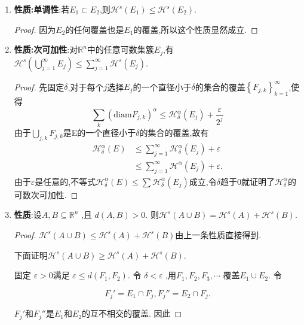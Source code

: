 \documentclass[hyperref,a4paper,UTF8]{ctexart}
\begin{document}
\begin{enumerate}

  \item \textbf{性质:单调性}:若$E_1 \subset E_2$,则$\mathcal{H}^s(E_1) \leqslant \mathcal{H}^s(E_2)$.

  \begin{proof}
    因为$E_2$的任何覆盖也是$E_1$的覆盖,所以这个性质显然成立.
  \end{proof}

  \item \textbf{性质:次可加性}:对$\mathbb{R}^n$中的任意可数集簇${E_j}$,有$\mathcal{H}^s\left(\bigcup\limits_{j=1}^{\infty} E_j\right) \leqslant \sum_{j=1}^{\infty} \mathcal{H}^s\left(E_j\right)$.
  \begin{proof}
    先固定$\delta$,对于每个$j$选择$E_j$的一个直径小于$\delta$的集合的覆盖$\left \{  F_{j,k} \right \}^{\infty}_{k=1}$,使得
    $$\sum_k(\mathrm{diam}F_{j,k})^{\alpha}\leqslant \mathcal{H}_\delta^\alpha(E_j)+\frac{\varepsilon}{2^j} $$
    由于$\bigcup\limits_{j,k} F_{j,k}$是E的一个直径小于$\delta$的集合的覆盖,故有
    \begin{align*}
      \mathcal{H}_\delta^\alpha(E) & \leqslant \sum_{j=1}^{\infty} \mathcal{H}_\delta^\alpha(E_j)+\varepsilon \\
      & \leqslant \sum_{j=1}^{\infty} \mathcal{H}^\alpha(E_j)+\varepsilon. 
    \end{align*}
    由于$\varepsilon$是任意的,不等式$\mathcal{H}_\delta^\alpha(E) \leqslant \sum \mathcal{H}_\delta^\alpha(E_j)$成立,令$\delta$趋于0就证明了$\mathcal{H}_\delta^\alpha$的可数次可加性.
  \end{proof}
  
  \item \textbf{性质}:设$A,B \subseteq \mathbb{R}^n$ ,且 $d(A, B)>0$.
   则$\mathcal{H}^{s}(A \cup B)=\mathcal{H}^{s}(A)+\mathcal{H}^{s}(B)$.

  \begin{proof}
    $\mathcal{H}^{s}(A \cup B)\leqslant \mathcal{H}^{s}(A)+\mathcal{H}^{s}(B)$由上一条性质直接得到.

    下面证明$\mathcal{H}^{s}(A \cup B)\geqslant \mathcal{H}^{s}(A)+\mathcal{H}^{s}(B)$. 

    固定 $\varepsilon > 0 $满足 $\varepsilon \le d(F_1, F_2)$. 令 $\delta < \varepsilon$ ,用$F_1, F_2, F_3, \cdots$ 覆盖$E_1\cup E_2$. 
    令

    \[
      F_j' = E_1 \cap F_j, F_j{''} = E_2 \cap F_j. 
    \]

    ${F_j'}$和${F_j{''}}$是$E_1$和$E_2$的互不相交的覆盖. 
    因此


\end{proof}
\end{enumerate}
\end{document}
